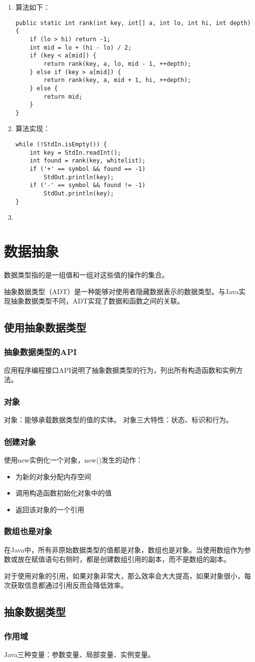 \begin{enumerate}
	\item 算法如下：
	\begin{lstlisting}
public static int rank(int key, int[] a, int lo, int hi, int depth) {
	if (lo > hi) return -1;
	int mid = lo + (hi - lo) / 2;
	if (key < a[mid]) {
		return rank(key, a, lo, mid - 1, ++depth);
	} else if (key > a[mid]) {
		return rank(key, a, mid + 1, hi, ++depth);
	} else {
		return mid;
	}
}
	\end{lstlisting}
	\item 算法实现：
	\begin{lstlisting}
while (!StdIn.isEmpty()) {
	int key = StdIn.readInt();
	int found = rank(key, whitelist);
	if ('+' == symbol && found == -1)
		StdOut.println(key);
	if ('-' == symbol && found != -1)
		StdOut.println(key);
}
	\end{lstlisting}
	\item 
\end{enumerate}

\section{数据抽象}
数据类型指的是一组值和一组对这些值的操作的集合。
\par 抽象数据类型（ADT）是一种能够对使用者隐藏数据表示的数据类型。与Java实现抽象数据类型不同，ADT实现了数据和函数之间的关联。
\subsection{使用抽象数据类型}
\subsubsection*{抽象数据类型的API}
应用程序编程接口API说明了抽象数据类型的行为，列出所有构造函数和实例方法。
\subsubsection*{对象}
对象：能够承载数据类型的值的实体。
对象三大特性：状态、标识和行为。
\subsubsection*{创建对象}
使用new实例化一个对象，new()发生的动作：
\begin{itemize}
	\item 为新的对象分配内存空间
	\item 调用构造函数初始化对象中的值
	\item 返回该对象的一个引用
\end{itemize}
\subsubsection*{数组也是对象}
在Java中，所有非原始数据类型的值都是对象，数组也是对象。当使用数组作为参数或放在赋值语句右侧时，都是创建数组引用的副本，而不是数组的副本。
\par 对于使用对象的引用，如果对象非常大，那么效率会大大提高，如果对象很小，每次获取信息都通过引用反而会降低效率。
\subsection{抽象数据类型}
\subsubsection*{作用域}
Java三种变量：参数变量、局部变量、实例变量。